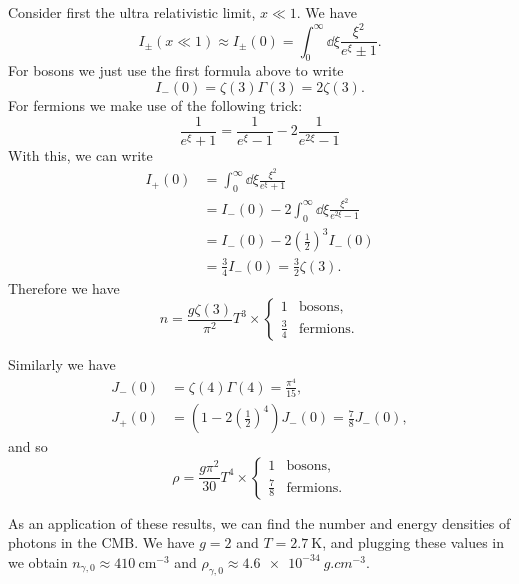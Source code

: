 \documentclass{jknotes}
\begin{document}
Consider first the ultra relativistic limit, \(x\ll 1\). We have 
\begin{equation}
    I_\pm(x \ll 1) \approx I_\pm(0) = \int_0^\infty\dd{\xi}\frac{\xi^2}{e^\xi\pm1}.
\end{equation}
For bosons we just use the first formula above to write
\begin{equation}
    I_-(0) = \zeta(3)\Gamma(3) = 2\zeta(3).
\end{equation}
For fermions we make use of the following trick:
\begin{equation}
    \frac{1}{e^\xi+1} = \frac{1}{e^\xi-1} - 2\frac{1}{e^{2\xi}-1}
\end{equation}
With this, we can write
\begin{align}
    I_+(0) &= \int^\infty_0 \dd{\xi}\frac{\xi^2}{e^\xi+1} \\
           &= I_-(0) - 2\int^\infty_0 \dd{\xi}\frac{\xi^2}{e^{2\xi}-1} \\
           &= I_-(0) - 2\left(\frac12\right)^3I_-(0) \\
           &= \frac{3}{4}I_-(0) = \frac32\zeta(3).
\end{align}
Therefore we have
\begin{equation}
    n = \frac{g \zeta(3)}{\pi^2}T^3 \times 
    \begin{cases}
        1 & \text{bosons}, \\
        \frac{3}{4} & \text{fermions}.
    \end{cases}
\end{equation}

Similarly we have
\begin{align}
    J_-(0) &= \zeta(4) \Gamma(4) = \frac{\pi^4}{15}, \\
    J_+(0) &= \left(1-2\left(\frac12\right)^4\right)J_-(0) = \frac78 J_-(0),
\end{align}
and so
\begin{equation}
    \rho = \frac{g\pi^2}{30}T^4\times
    \begin{cases}
        1 & \text{bosons}, \\
        \frac78 & \text{fermions}.
    \end{cases}
\end{equation}

As an application of these results, we can find the number and energy densities of photons in the CMB. We have \(g = 2\) and \(T = \SI{2.7}{\kelvin}\), and plugging these values in we obtain \(n_{\gamma,0} \approx \SI{410}{\centi\metre^{-3}}\) and \(\rho_{\gamma,0} \approx \SI{4.6e-34}{g.cm^{-3}}\).
\end{document}
